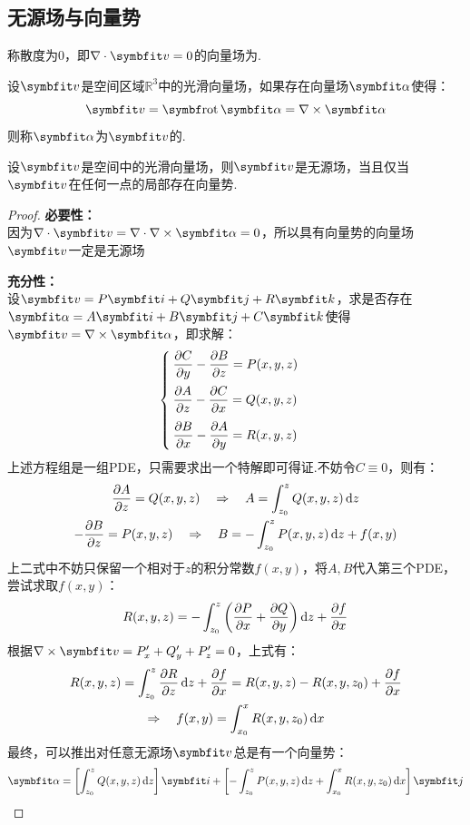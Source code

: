 \subsection{无源场与向量势}
\begin{definition}
    称散度为$0$，即$\nabla\cdot\vb{v} = 0$的向量场为.
\end{definition}

\begin{definition}
    设$\vb{v}$是空间区域$\mathbb{R}^3$中的光滑向量场，如果存在向量场$\vb{\alpha}$使得：
    \[\vb{v} = \rot\vb{\alpha} = \nabla\times\vb{\alpha}\]
    则称$\vb{\alpha}$为$\vb{v}$的.
\end{definition}

\begin{theorem}
    设$\vb{v}$是空间中的光滑向量场，则$\vb{v}$是无源场，当且仅当$\vb{v}$在任何一点的局部存在向量势.
\end{theorem}

\begin{proof}
    \textbf{必要性：}\\
    因为$\nabla\cdot\vb{v} = \nabla\cdot\nabla\times\vb{\alpha} = 0$，所以具有向量势的向量场$\vb{v}$一定是无源场

    \textbf{充分性：}\\
    设$\vb{v} = P\vb{i} + Q\vb{j} + R\vb{k}$，求是否存在$\vb{\alpha} = A\vb{i} + B\vb{j} + C\vb{k}$使得$\vb{v} = \nabla\times\vb{\alpha}$，即求解：
    \[\begin{cases}
        \displaystyle\pdv{C}{y} - \pdv{B}{z} = P(x,y,z) \\[1em]
        \displaystyle\pdv{A}{z} - \pdv{C}{x} = Q(x,y,z) \\[1em]
        \displaystyle\pdv{B}{x} - \pdv{A}{y} = R(x,y,z)
    \end{cases}\]
    上述方程组是一组PDE，只需要求出一个特解即可得证.不妨令$C\equiv 0$，则有：
    \begin{gather*}
        \pdv{A}{z} = Q(x,y,z) \quad\Rightarrow\quad A = \int_{z_0}^{z}Q(x,y,z)\dd{z} \\
        -\pdv{B}{z} = P(x,y,z) \quad\Rightarrow\quad B = -\int_{z_0}^{z}P(x,y,z)\dd{z} + f(x,y)
    \end{gather*}
    上二式中不妨只保留一个相对于$z$的积分常数$f(x,y)$，将$A,B$代入第三个PDE，尝试求取$f(x,y)$：
    \[R(x,y,z) = -\int_{z_0}^{z}\left(\pdv{P}{x}+\pdv{Q}{y}\right)\dd{z} + \pdv{f}{x}\]
    根据$\nabla\times\vb{v} = P'_x + Q'_y + P'_z = 0$，上式有：
    \begin{gather*}
        R(x,y,z) = \int_{z_0}^{z}\pdv{R}{z}\dd{z} + \pdv{f}{x} = R(x,y,z) - R(x,y,z_0) + \pdv{f}{x}\\
        \Rightarrow\quad f(x,y) = \int_{x_0}^{x}R(x,y,z_0)\dd{x}
    \end{gather*}
    最终，可以推出对任意无源场$\vb{v}$总是有一个向量势：
    \[\vb{\alpha} = \left[\int_{z_0}^{z}Q(x,y,z)\dd{z}\right]\vb{i} + \left[-\int_{z_0}^{z}P(x,y,z)\dd{z} + \int_{x_0}^{x}R(x,y,z_0)\dd{x}\right]\vb{j}\]
\end{proof}


